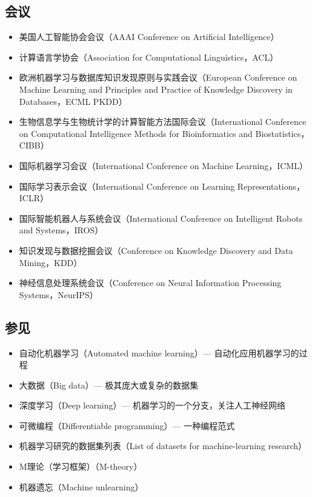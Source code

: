 \subsection{会议}  
\begin{itemize}
\item 美国人工智能协会会议（AAAI Conference on Artificial Intelligence）  
\item 计算语言学协会（Association for Computational Linguistics，ACL）  
\item 欧洲机器学习与数据库知识发现原则与实践会议（European Conference on Machine Learning and Principles and Practice of Knowledge Discovery in Databases，ECML PKDD）  
\item 生物信息学与生物统计学的计算智能方法国际会议（International Conference on Computational Intelligence Methods for Bioinformatics and Biostatistics，CIBB）  
\item 国际机器学习会议（International Conference on Machine Learning，ICML）  
\item 国际学习表示会议（International Conference on Learning Representations，ICLR）  
\item 国际智能机器人与系统会议（International Conference on Intelligent Robots and Systems，IROS）  
\item 知识发现与数据挖掘会议（Conference on Knowledge Discovery and Data Mining，KDD）  
\item 神经信息处理系统会议（Conference on Neural Information Processing Systems，NeurIPS）  
\end{itemize}
\subsection{参见}  
\begin{itemize}
\item 自动化机器学习（Automated machine learning）— 自动化应用机器学习的过程  
\item 大数据（Big data）— 极其庞大或复杂的数据集  
\item 深度学习（Deep learning）— 机器学习的一个分支，关注人工神经网络  
\item 可微编程（Differentiable programming）— 一种编程范式  
\item 机器学习研究的数据集列表（List of datasets for machine-learning research）  
\item M理论（学习框架）（M-theory）  
\item 机器遗忘（Machine unlearning）
\end{itemize}  

